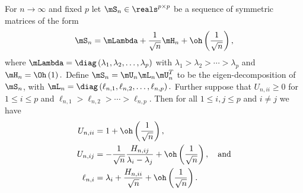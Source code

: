 \begin{lemma}\label{L:eigen-perturb}
For 
\(
    n \to \infty
\)
and fixed
\(
    p
\)
let
\(
    \mS_n \in \reals^{p\times p}
\) 
be a sequence of symmetric matrices of the form
\[
    \mS_n 
    = 
    \mLambda
    +
    \frac{1}{\sqrt{n}}
    \mH_n
    +
    \oh\left( \frac{1}{\sqrt{n}} \right),
\]
where
\(
    \mLambda
    =
    \diag \left(
        \lambda_1,
        \lambda_2,
        \ldots,
        \lambda_p
    \right)
\)
with 
\(
    \lambda_1 > \lambda_2 > \cdots > \lambda_p
\) 
and
\(
    \mH_n = \Oh\left( 1 \right).
\)
Define $\mS_n = \mU_n \mL_n \mU_n^T$ to be the eigen-decomposition of $\mS_n$, with
\(
    \mL_n
    =
    \diag \left(
        \ell_{n,1}, \ell_{n,2}, \ldots, \ell_{n,p}
    \right).
\)
Further suppose that $U_{n,ii} \geq 0$ for $1 \leq i \leq p$ and
\(
    \ell_{n,1} > \ell_{n,2} > \cdots > \ell_{n,p}.
\)
Then for all $1 \leq i,j \leq p$ and $i \neq j$ we have
\begin{subequations}
\begin{align}
    U_{n,ii} 
        &= 1 
           + 
           \oh \left( 
               \frac{ 1 }{ \sqrt{n} }
           \right), \\
    U_{n,ij}
        &= -
           \frac{ 1 }{ \sqrt{n} }
           \frac{ H_{n,ij} }{ \lambda_i - \lambda_j }
           +
           \oh \left(
               \frac{ 1 }{ \sqrt{n} }
           \right), \quad \text{and} \\
    \ell_{n,i}
        &= \lambda_i
           + 
           \frac{ H_{n,ii} }{ \sqrt{n} }
           +
           \oh \left(
               \frac{ 1 }{ \sqrt{n} }
           \right).
\end{align}
\end{subequations}
\end{lemma}

